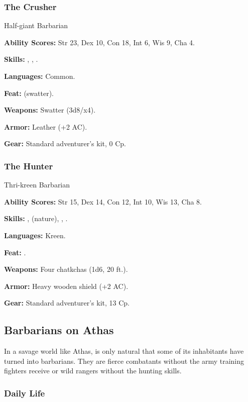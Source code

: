 \subsubsection{The Crusher}

Half-giant Barbarian

\textbf{Ability Scores:} Str 23, Dex 10, Con 18, Int 6, Wis 9, Cha 4.

\textbf{Skills:} , , .

\textbf{Languages:} Common.

\textbf{Feat:}  (swatter).

\textbf{Weapons:} Swatter (3d8/x4).

\textbf{Armor:} Leather (+2 AC).

\textbf{Gear:} Standard adventurer's kit, 0 Cp.

\subsubsection{The Hunter}

Thri-kreen Barbarian

\textbf{Ability Scores:} Str 15, Dex 14, Con 12, Int 10, Wis 13, Cha 8.

\textbf{Skills:} ,  (nature), , .

\textbf{Languages:} Kreen.

\textbf{Feat:} .

\textbf{Weapons:} Four chatkchas (1d6, 20 ft.).

\textbf{Armor:} Heavy wooden shield (+2 AC).

\textbf{Gear:} Standard adventurer's kit, 13 Cp.

\subsection{Barbarians on Athas}

In a savage world like Athas, is only natural that some of its inhabitants have turned into barbarians. They are fierce combatants without the army training fighters receive or wild rangers without the hunting skills.

\subsubsection{Daily Life}

